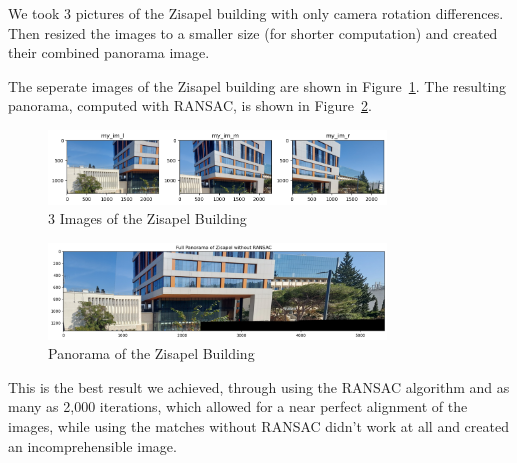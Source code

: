\documentclass{article}
\begin{document}
We took 3 pictures of the Zisapel building  with only camera rotation differences. Then resized the images to a smaller size (for shorter computation) and created their combined panorama image.

The seperate images of the Zisapel building are shown in Figure~\ref{fig:3_7_zisapels}. The resulting panorama, computed with RANSAC, is shown in Figure~\ref{fig:3_7_pan}.

\begin{figure}[h!]
    \centering
    \includegraphics[width=0.8\textwidth]{../output/3.7_buildings.png}
    \caption{3 Images of the Zisapel Building}
    \label{fig:3_7_zisapels}
\end{figure}

\begin{figure}[h!]
    \centering
    \includegraphics[width=0.8\textwidth]{../output/3.7_pan.png}
    \caption{Panorama of the Zisapel Building}
    \label{fig:3_7_pan}
\end{figure}

This is the best result we achieved, through using the RANSAC algorithm and as many as 2,000 iterations, which allowed for a near perfect alignment of the images, while using the matches without RANSAC didn't work at all and created an incomprehensible image.
\end{document}
